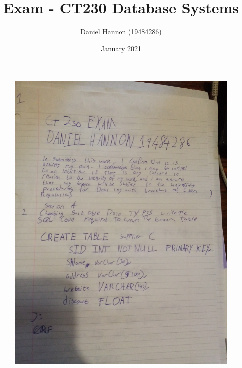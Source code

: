 \documentclass{article}
\title{Exam - CT230 Database Systems}
\author{Daniel Hannon (19484286)}
\date{January 2021}
\begin{document}
	\maketitle
	\begin{figure}
		\centering
		\includegraphics[width=\textwidth]{IMG_20210113_113108}
	\end{figure}
	\newpage
\end{document}

